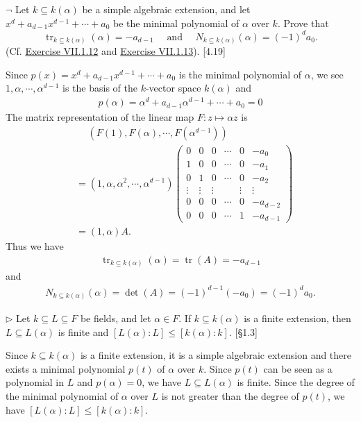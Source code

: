 \begin{problem}[1.14]
$\neg$ Let $k \subseteq k(\alpha)$ be a simple algebraic extension, and let $x^{d}+a_{d-1} x^{d-1}+\cdots+a_{0}$ be the minimal polynomial of $\alpha$ over $k$. Prove that
$$
\operatorname{tr}_{k \subseteq k(\alpha)}(\alpha)=-a_{d-1} \quad \text { and } \quad N_{k \subseteq k(\alpha)}(\alpha)=(-1)^{d} a_{0} .
$$
(Cf. \hyperlink{Exercise VII.1.12}{Exercise VII.1.12} and \hyperlink{Exercise VII.1.13}{Exercise VII.1.13}). [4.19]
\end{problem}
\begin{solution}
	Since $p(x)=x^{d}+a_{d-1} x^{d-1}+\cdots+a_{0}$ is the minimal polynomial of $\alpha$, we see $1,\alpha,\cdots,\alpha^{d-1}$ is the basis of the $k$-vector space $k(\alpha)$ and  
	\begin{align*}
		p(\alpha)=\alpha^{d}+a_{d-1} \alpha^{d-1}+\cdots+a_{0}=0
	\end{align*}	
	The matrix representation of the linear map $F:z\mapsto \alpha z$ is
	\begin{align*}
		&\hspace{15pt}\left(F(1),F\left(\alpha\right),\cdots,F\left(\alpha^{d-1}\right)\right)\\
		&=\left(1,\alpha,\alpha^2,\cdots,\alpha^{d-1}\right)
		\begin{pmatrix}
			0&0&0&\cdots&0&-a_0\\
			1&0&0&\cdots&0&-a_1\\
			0&1&0&\cdots&0&-a_2\\
			\vdots&\vdots&\vdots&&\vdots&\vdots\\
			0&0&0&\cdots&0&-a_{d-2}\\
			0&0&0&\cdots&1&-a_{d-1}
		\end{pmatrix}\\
		&=\left(1,\alpha\right)A. 	
	\end{align*}
Thus we have
	\begin{align*}
		\operatorname{tr}_{k \subseteq k(\alpha)}(\alpha)=\operatorname{tr}(A)=-a_{d-1}
	\end{align*}
	and
	\begin{align*}
		 N_{k \subseteq k(\alpha)}(\alpha)=\det(A)=(-1)^{d-1} (-a_{0})= (-1)^{d} a_{0}.
	\end{align*}
\end{solution}


\begin{problem}[1.16]
$\triangleright$ Let $k \subseteq L \subseteq F$ be fields, and let $\alpha \in F$. If $k \subseteq k(\alpha)$ is a finite extension, then $L \subseteq L(\alpha)$ is finite and $[L(\alpha): L] \leq[k(\alpha): k]$. [§1.3]
\end{problem}
\begin{solution}
	Since $k \subseteq k(\alpha)$ is a finite extension, it is a simple algebraic extension and there exists a minimal polynomial $p(t)$ of $\alpha$ over $k$. Since $p(t)$ can be seen as a polynomial in $L$ and $p(\alpha)=0$, we have $L \subseteq L(\alpha)$ is finite. Since the degree of the minimal polynomial of $\alpha$ over $L$ is not greater than the degree of $p(t)$, we have $[L(\alpha): L] \leq[k(\alpha): k]$.
\end{solution}

